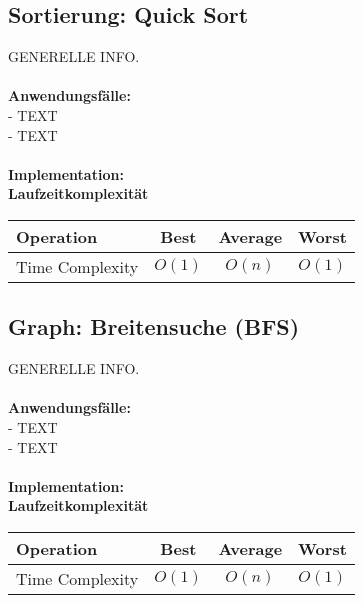 \documentclass[../main.tex]{subfiles}
\begin{document}
	\subsection{Sortierung: Quick Sort}
	GENERELLE INFO. \\\\
	\textbf{Anwendungsfälle:}\\
	- TEXT\\
	- TEXT\\\\
	\textbf{Implementation:}\\
	 
	\textbf{Laufzeitkomplexität}\\
	\begin{table}[ht]
		\centering
		\begin{tabular}{l *{3}{c}}
			\toprule
			Operation & Best & Average & Worst\\
			\midrule
			Time Complexity & $O(1)$ & $O(n)$ & $O(1)$\\
			\bottomrule
		\end{tabular}
	\end{table}
	\clearpage
	
	\subsection{Graph: Breitensuche (BFS)}
	GENERELLE INFO. \\\\
	\textbf{Anwendungsfälle:}\\
	- TEXT\\
	- TEXT\\\\
	\textbf{Implementation:}\\
	 
	\textbf{Laufzeitkomplexität}\\
	\begin{table}[ht]
		\centering
		\begin{tabular}{l *{3}{c}}
			\toprule
			Operation & Best & Average & Worst\\
			\midrule
			Time Complexity & $O(1)$ & $O(n)$ & $O(1)$\\
			\bottomrule
		\end{tabular}
	\end{table}
	\clearpage
	
\end{document}
